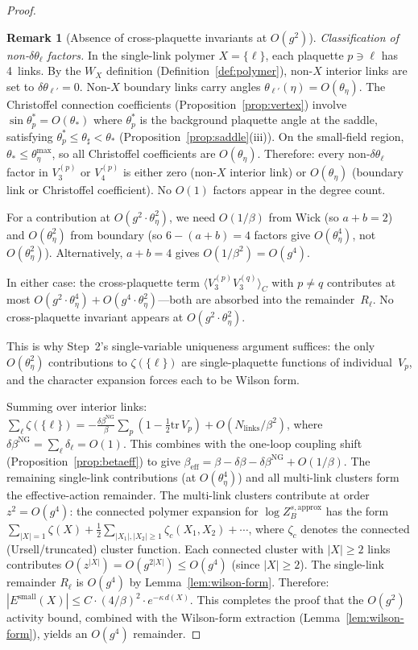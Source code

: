 \documentclass[11pt]{article}
\theoremstyle{definition}
\newtheorem{remark}[theorem]{Remark}
\newcommand{\tr}{\mathrm{tr}}
\begin{document}
\begin{proof}
\begin{remark}[Absence of cross-plaquette invariants at $O(g^2)$]
\emph{Classification of non-$\delta\theta_\ell$ factors.}
In the single-link polymer $X=\{\ell\}$, each plaquette
$p\ni\ell$ has 4~links.  By the $W_X$ definition
(Definition~\ref{def:polymer}), non-$X$ interior links
are set to $\delta\theta_{\ell'}=0$.  Non-$X$ boundary
links carry angles $\theta_{\ell'}(\eta)=O(\theta_\eta)$.
The Christoffel connection coefficients
(Proposition~\ref{prop:vertex}) involve
$\sin\theta_p^*=O(\theta_*)$ where $\theta_p^*$ is the
background plaquette angle at the saddle, satisfying
$\theta_p^*\le\theta_\sharp<\theta_*$ (Proposition~\ref{prop:saddle}(iii)).
On the small-field region, $\theta_*\le\theta_\eta^{\max}$,
so all Christoffel coefficients are $O(\theta_\eta)$.
Therefore: every non-$\delta\theta_\ell$ factor in
$V_3^{(p)}$ or $V_4^{(p)}$ is either zero (non-$X$
interior link) or $O(\theta_\eta)$ (boundary link or
Christoffel coefficient).  No $O(1)$ factors appear
in the degree count.

For a contribution at $O(g^2\cdot\theta_\eta^2)$, we
need $O(1/\beta)$ from Wick (so $a+b=2$) and $O(\theta_\eta^2)$
from boundary (so $6-(a+b)=4$ factors give
$O(\theta_\eta^4)$, not $O(\theta_\eta^2)$).
Alternatively, $a+b=4$ gives $O(1/\beta^2)=O(g^4)$.

In either case: the cross-plaquette term
$\langle V_3^{(p)}V_3^{(q)}\rangle_C$ with $p\ne q$
contributes at most $O(g^2\cdot\theta_\eta^4)
+O(g^4\cdot\theta_\eta^2)$---both are absorbed into
the remainder~$R_\ell$.  No cross-plaquette invariant
appears at $O(g^2\cdot\theta_\eta^2)$.

This is why Step~2's single-variable uniqueness argument
suffices: the only $O(\theta_\eta^2)$ contributions to
$\zeta(\{\ell\})$ are single-plaquette functions of
individual~$V_p$, and the character expansion forces
each to be Wilson form.
\end{remark}

Summing over interior links:
$\sum_\ell\zeta(\{\ell\})
=-\frac{\delta\beta^{\mathrm{NG}}}{\beta}\sum_p
(1-\frac{1}{2}\tr\,V_p)+O(N_{\mathrm{links}}/\beta^2)$,
where $\delta\beta^{\mathrm{NG}}=\sum_\ell\delta_\ell=O(1)$.
This combines with the one-loop coupling shift
(Proposition~\ref{prop:betaeff}) to give
$\beta_{\mathrm{eff}}=\beta-\delta\beta-\delta\beta^{\mathrm{NG}}
+O(1/\beta)$.
The remaining single-link contributions (at $O(\theta_\eta^4)$)
and all multi-link clusters form the
effective-action remainder.  The multi-link clusters contribute
at order $z^2=O(g^4)$: the connected polymer expansion for
$\log Z_B^{s,\mathrm{approx}}$ has the form
$\sum_{|X|=1}\zeta(X)+\frac{1}{2}\sum_{|X_1|,|X_2|\ge 1}
\zeta_c(X_1,X_2)+\cdots$, where $\zeta_c$ denotes the
connected (Ursell/truncated) cluster function.  Each connected
cluster with $|X|\ge 2$ links contributes $O(z^{|X|})
=O(g^{2|X|})\le O(g^4)$ (since $|X|\ge 2$).  The single-link
remainder $R_\ell$ is $O(g^4)$ by Lemma~\ref{lem:wilson-form}.
Therefore:
$|E^{\mathrm{small}}(X)|\le C\cdot(4/\beta)^2
\cdot e^{-\kappa\,d(X)}$.
This completes the proof that the $O(g^2)$ activity bound,
combined with the Wilson-form extraction
(Lemma~\ref{lem:wilson-form}), yields an $O(g^4)$ remainder.
\end{proof}
\end{document}
